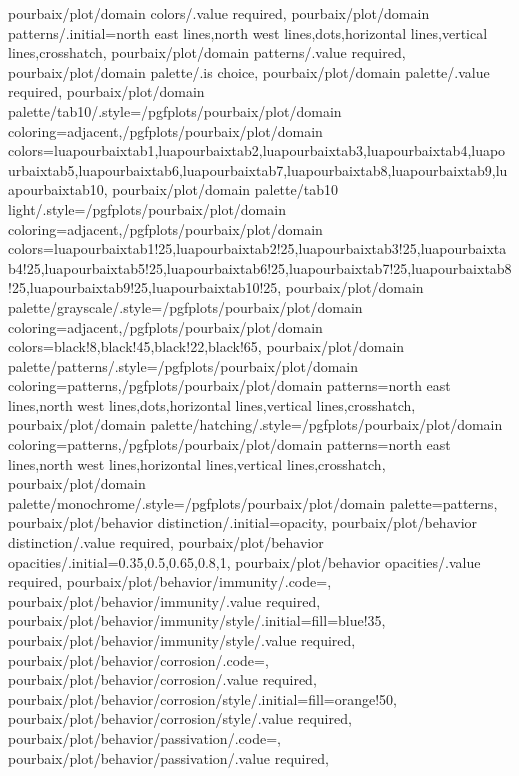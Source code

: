 {  pourbaix/plot/domain colors/.value required,
  pourbaix/plot/domain patterns/.initial={north east lines,north west lines,dots,horizontal lines,vertical lines,crosshatch},
  pourbaix/plot/domain patterns/.value required,
  pourbaix/plot/domain palette/.is choice,
  pourbaix/plot/domain palette/.value required,
  pourbaix/plot/domain palette/tab10/.style={/pgfplots/pourbaix/plot/domain coloring=adjacent,/pgfplots/pourbaix/plot/domain colors={luapourbaixtab1,luapourbaixtab2,luapourbaixtab3,luapourbaixtab4,luapourbaixtab5,luapourbaixtab6,luapourbaixtab7,luapourbaixtab8,luapourbaixtab9,luapourbaixtab10}},
  pourbaix/plot/domain palette/tab10 light/.style={/pgfplots/pourbaix/plot/domain coloring=adjacent,/pgfplots/pourbaix/plot/domain colors={luapourbaixtab1!25,luapourbaixtab2!25,luapourbaixtab3!25,luapourbaixtab4!25,luapourbaixtab5!25,luapourbaixtab6!25,luapourbaixtab7!25,luapourbaixtab8!25,luapourbaixtab9!25,luapourbaixtab10!25}},
  pourbaix/plot/domain palette/grayscale/.style={/pgfplots/pourbaix/plot/domain coloring=adjacent,/pgfplots/pourbaix/plot/domain colors={black!8,black!45,black!22,black!65}},
  pourbaix/plot/domain palette/patterns/.style={/pgfplots/pourbaix/plot/domain coloring=patterns,/pgfplots/pourbaix/plot/domain patterns={north east lines,north west lines,dots,horizontal lines,vertical lines,crosshatch}},
  pourbaix/plot/domain palette/hatching/.style={/pgfplots/pourbaix/plot/domain coloring=patterns,/pgfplots/pourbaix/plot/domain patterns={north east lines,north west lines,horizontal lines,vertical lines,crosshatch}},
  pourbaix/plot/domain palette/monochrome/.style={/pgfplots/pourbaix/plot/domain palette=patterns},
  pourbaix/plot/behavior distinction/.initial=opacity,
  pourbaix/plot/behavior distinction/.value required,
  pourbaix/plot/behavior opacities/.initial={0.35,0.5,0.65,0.8,1},
  pourbaix/plot/behavior opacities/.value required,
  pourbaix/plot/behavior/immunity/.code={},
  pourbaix/plot/behavior/immunity/.value required,
  pourbaix/plot/behavior/immunity/style/.initial={fill=blue!35},
  pourbaix/plot/behavior/immunity/style/.value required,
  pourbaix/plot/behavior/corrosion/.code={},
  pourbaix/plot/behavior/corrosion/.value required,
  pourbaix/plot/behavior/corrosion/style/.initial={fill=orange!50},
  pourbaix/plot/behavior/corrosion/style/.value required,
  pourbaix/plot/behavior/passivation/.code={},
  pourbaix/plot/behavior/passivation/.value required,
}
